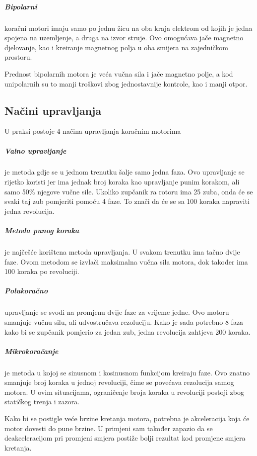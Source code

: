 \documentclass[../Document.tex]{subfiles}
\begin{document}

\subparagraph{Bipolarni} \noindent koračni motori imaju samo po jednu žicu na oba kraja elektrom od kojih je jedna spojena na uzemljenje, a druga na izvor struje. Ovo omogućava jače magnetno djelovanje, kao i kreiranje magnetnog polja u oba smijera na zajedničkom prostoru.\\


\noindent Prednost bipolarnih motora je veća vučna sila i jače magnetno polje, a kod unipolarnih su to manji troškovi zbog jednostavnije kontrole, kao i manji otpor\cite{unipolarvsbipolar}.

\subsection{Načini upravljanja}
U praksi postoje 4 načina upravljanja koračnim motorima

\subparagraph{Valno upravljanje} je metoda gdje se u jednom trenutku šalje samo jedna faza. Ovo upravljanje se rijetko koristi jer ima jednak broj koraka kao upravljanje punim korakom, ali samo 50\% njegove vučne sile. Ukoliko zupčanik ra rotoru ima 25 zuba, onda će se svaki taj zub pomjeriti pomoću 4 faze. To znači da će se sa 100 koraka napraviti jedna revolucija.\\

\subparagraph{Metoda punog koraka} je najčešće korištena metoda upravljanja. U svakom trenutku ima tačno dvije faze. Ovom metodom se izvlači maksimalna vučna sila motora, dok također ima 100 koraka po revoluciji.\\


\subparagraph{Polukoračno} upravljanje se svodi na promjenu dvije faze za vrijeme jedne. Ovo motoru smanjuje vučnu silu, ali udvostručava rezoluciju. Kako je sada potrebno 8 faza kako bi se zupčanik pomjerio za jedan zub, jedna  revolucija zahtjeva 200 koraka.\\


\subparagraph{Mikrokoračanje} je metoda u kojoj se sinusnom i kosinusnom funkcijom kreiraju faze. Ovo znatno smanjuje broj koraka u jednoj revoluciji, čime se povećava rezolucija samog motora. U ovim situacijama, ograničenje broja koraka u revoluciji postoji zbog statičkog trenja i zazora.\\

\noindent Kako bi se postigle veće brzine kretanja motora, potrebna je akceleracija koja će motor dovesti do pune brzine. U primjeni sam također zapazio da se deakceleracijom pri promjeni smjera postiže bolji rezultat kod promjene smjera kretanja.
\end{document}
